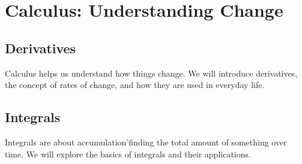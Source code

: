 \chapter{Calculus: Understanding Change}
\section{Derivatives}
Calculus helps us understand how things change. We will introduce derivatives, the concept of rates of change, and how they are used in everyday life.

\section{Integrals}
Integrals are about accumulation'finding the total amount of something over time. We will explore the basics of integrals and their applications.